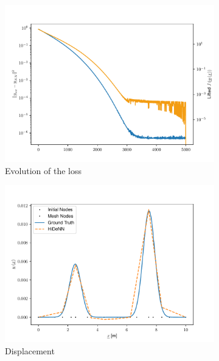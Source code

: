 \begin{figure}
    \begin{subfigure}{0.3\linewidth}
        \centering
        \includegraphics[width=\linewidth]{Figures/Loss_Comaprison_10_Regul.pdf}
        \caption{Evolution of the loss}
    \end{subfigure}
    \begin{subfigure}{0.3\linewidth}
        \centering
        \includegraphics[width=\linewidth]{Figures/Solution_displacement_10_Regul.pdf}
        \caption{Displacement}
    \end{subfigure}
    \begin{subfigure}{0.3\linewidth}
        \centering

\end{subfigure}
\end{figure}
